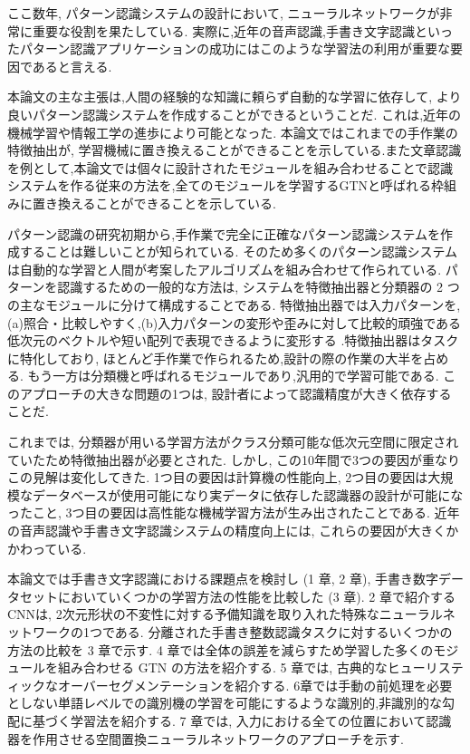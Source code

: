 \documentclass[twocolumn]{jarticle}     %
\begin{document}
ここ数年, パターン認識システムの設計において, ニューラルネットワークが非常に重要な役割を果たしている. 
実際に,近年の音声認識,手書き文字認識といったパターン認識アプリケーションの成功にはこのような学習法の利用が重要な要因であると言える.\par
本論文の主な主張は,人間の経験的な知識に頼らず自動的な学習に依存して, より良いパターン認識システムを作成することができるということだ.
これは,近年の機械学習や情報工学の進歩により可能となった.
本論文ではこれまでの手作業の特徴抽出が, 学習機械に置き換えることができることを示している.また文章認識を例として,本論文では個々に設計されたモジュールを組み合わせることで認識システムを作る従来の方法を,全てのモジュールを学習するGTNと呼ばれる枠組みに置き換えることができることを示している.
\par
パターン認識の研究初期から,手作業で完全に正確なパターン認識システムを作成することは難しいことが知られている. そのため多くのパターン認識システムは自動的な学習と人間が考案したアルゴリズムを組み合わせて作られている. パターンを認識するための一般的な方法は, システムを特徴抽出器と分類器の 2 つの主なモジュールに分けて構成することである.
特徴抽出器では入力パターンを, (a)照合・比較しやすく,(b)入力パターンの変形や歪みに対して比較的頑強である低次元のベクトルや短い配列で表現できるように変形する .特徴抽出器はタスクに特化しており, ほとんど手作業で作られるため,設計の際の作業の大半を占める.
もう一方は分類機と呼ばれるモジュールであり,汎用的で学習可能である.
このアプローチの大きな問題の1つは, 設計者によって認識精度が大きく依存することだ.\par
これまでは, 分類器が用いる学習方法がクラス分類可能な低次元空間に限定されていたため特徴抽出器が必要とされた. しかし, この10年間で3つの要因が重なりこの見解は変化してきた.
1つ目の要因は計算機の性能向上, 2つ目の要因は大規模なデータベースが使用可能になり実データに依存した認識器の設計が可能になったこと, 3つ目の要因は高性能な機械学習方法が生み出されたことである. 近年の音声認識や手書き文字認識システムの精度向上には, これらの要因が大きくかかわっている.
\par
本論文では手書き文字認識における課題点を検討し (1 章, 2 章), 手書き数字データセットにおいていくつかの学習方法の性能を比較した (3 章). 2 章で紹介する CNNは, 2次元形状の不変性に対する予備知識を取り入れた特殊なニューラルネットワークの1つである. 分離された手書き整数認識タスクに対するいくつかの方法の比較を 3 章で示す. 4 章では全体の誤差を減らすため学習した多くのモジュールを組み合わせる GTN の方法を紹介する. 5 章では, 古典的なヒューリスティックなオーバーセグメンテーションを紹介する. 6章では手動の前処理を必要としない単語レベルでの識別機の学習を可能にするような識別的,非識別的な勾配に基づく学習法を紹介する. 7 章では, 入力における全ての位置において認識器を作用させる空間置換ニューラルネットワークのアプローチを示す.
\end{document}
